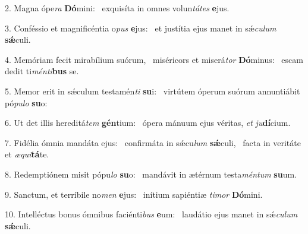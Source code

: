 2. Magna ópe\textit{ra} \textbf{Dó}mini: \ast\  exquisíta in omnes volun\textit{tá}\textit{tes} \textbf{e}jus.\

3. Conféssio et magnificéntia o\textit{pus} \textbf{e}jus: \ast\  et justítia ejus manet in sǽ\textit{cu}\textit{lum} \textbf{sǽ}culi.\

4. Memóriam fecit mirabílium suórum, \dag\  miséricors et miserá\textit{tor} \textbf{Dó}minus: \ast\  escam dedit ti\textit{mén}\textit{ti}\textbf{bus} se.\

5. Memor erit in sǽculum testamén\textit{ti} \textbf{su}i: \ast\  virtútem óperum suórum annuntiábit pó\textit{pu}\textit{lo} \textbf{su}o:\

6. Ut det illis hereditá\textit{tem} \textbf{gén}tium: \ast\  ópera mánuum ejus véritas, \textit{et} \textit{ju}\textbf{dí}cium.\

7. Fidélia ómnia mandáta ejus: \dag\  confirmáta in sǽcu\textit{lum} \textbf{sǽ}culi, \ast\  facta in veritáte et \textit{æ}\textit{qui}\textbf{tá}te.\

8. Redemptiónem misit pópu\textit{lo} \textbf{su}o: \ast\  mandávit in ætérnum testa\textit{mén}\textit{tum} \textbf{su}um.\

9. Sanctum, et terríbile no\textit{men} \textbf{e}jus: \ast\  inítium sapiéntiæ \textit{ti}\textit{mor} \textbf{Dó}mini.\

10. Intelléctus bonus ómnibus faciénti\textit{bus} \textbf{e}um: \ast\  laudátio ejus manet in sǽ\textit{cu}\textit{lum} \textbf{sǽ}culi.\

